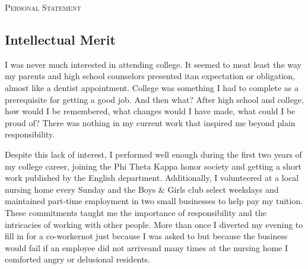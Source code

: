 \documentclass{article}
\begin{document}
\newcommand{\sloc}{7.7 million lines}
\newcommand{\numprojects}{43}


\begin{center}
\large{\textsc{Personal Statement}}
\end{center}

\subsection*{Intellectual Merit}
I was never much interested in attending college.
It seemed to me\textemdash at least the way my parents and high school counselors presented it\textemdash an expectation or obligation, almost like a dentist appointment. 
College was something I had to complete as a prerequisite for getting a good job.
And then what? 
After high school and college, how would I be remembered, what changes would I have made, what could I be proud of?
There was nothing in my current work that inspired me beyond plain responsibility.


Despite this lack of interest, I performed well enough during the first two years of my college career, joining the Phi Theta Kappa honor society and getting a short work published by the English department.
Additionally, I volunteered at a local nursing home every Sunday and the Boys \& Girls club select weekdays and maintained part-time employment in two small businesses to help pay my tuition.
These commitments taught me the importance of responsibility and the intricacies of working with other people. 
More than once I diverted my evening to fill in for a co-worker\textemdash not just because I was asked to but because the business would fail if an employee did not arrive\textemdash and many times at the nursing home I comforted angry or delusional residents.
\end{document}

